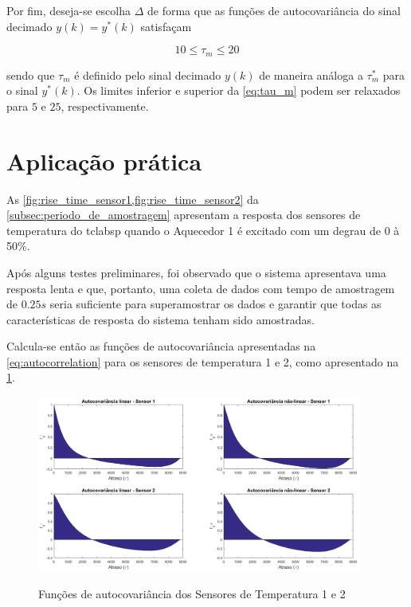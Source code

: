\begin{apendicesenv}
Por fim, deseja-se escolha $\Delta$ de forma que as funções de autocovariância do sinal decimado $y(k) = y^*(k)$
satisfaçam

\begin{equation}
    \label{eq:tau_m}
    10 \leq \tau_m \leq 20
\end{equation}

\noindent
sendo que $\tau_m$ é definido pelo sinal decimado $y(k)$ de maneira análoga a $\tau_m^*$ para o
sinal $y^*(k)$. Os limites inferior e superior da \cref{eq:tau_m} podem ser relaxados para
$5$ e $25$, respectivamente.

\section{Aplicação prática}
\label{ch:using_sampling_time_with_autocorrelation}

As \cref{fig:rise_time_sensor1,fig:rise_time_sensor2} da \cref{subsec:periodo_de_amostragem}
apresentam a resposta dos sensores de temperatura do \acrshort{tclabsp} quando o Aquecedor 1 é
excitado com um degrau de 0 à 50\%.

Após alguns testes preliminares, foi observado que o sistema apresentava uma resposta lenta
e que, portanto, uma coleta de dados com tempo de amostragem de $0.25s$ seria suficiente para
superamostrar os dados e garantir que todas as características de resposta do sistema tenham
sido amostradas.

Calcula-se então as funções de autocovariância apresentadas na \cref{eq:autocorrelation} para os
sensores de temperatura 1 e 2, como apresentado na \cref{fig:autocorrelationS1S2}.

\begin{figure}[h]
	\caption{Funções de autocovariância dos Sensores de Temperatura 1 e 2}
	\begin{center}
		\includegraphics[width=0.95\textwidth]{./5_images/AutocorrelationS1S2.png} 
		\label{fig:autocorrelationS1S2}
	\end{center}
	\centering
\end{figure}


\end{apendicesenv}
